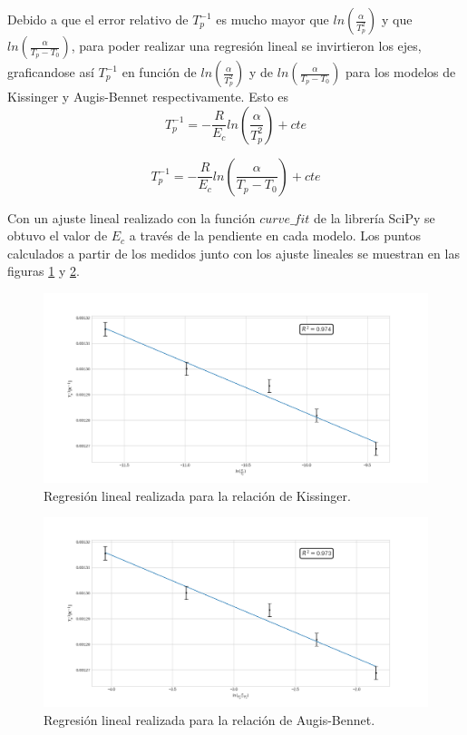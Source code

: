 \documentclass{article}
\theoremstyle{definition}
\theoremstyle{remark}
\begin{document}
Debido a que el error relativo de $T_p^{-1}$ es mucho mayor que $ln(\frac{\alpha}{T_p^2})$ y que $ln(\frac{\alpha}{T_p-T_0})$, para poder realizar una regresión lineal se invirtieron los ejes, graficandose así $T_p^{-1}$ en función de $ln(\frac{\alpha}{T_p^2})$ y de $ln(\frac{\alpha}{T_p-T_0})$ para los modelos de Kissinger y Augis-Bennet respectivamente. Esto es
\begin{equation}
	T_p^{-1}=-\frac{R}{E_c}ln(\frac{\alpha}{T_p^2})+cte
\end{equation}

\begin{equation}
	T_p^{-1}=-\frac{R}{E_c}ln(\frac{\alpha}{T_p-T_0})+cte
\end{equation}

Con un ajuste lineal realizado con la función $curve\_fit$ de la librería SciPy se obtuvo el valor de $E_c$ a través de la pendiente en cada modelo. Los puntos calculados a partir de los medidos junto con los ajuste lineales se muestran en las figuras \ref{Kiss} y \ref{AugBen}.


\begin{figure}[H]
 	\centering
	\includegraphics[scale=0.4]{img/Kissinger.png}
 	\caption{Regresión lineal realizada para la relación de Kissinger.}
	\label{Kiss}
\end{figure} 

 \begin{figure}[H]
 	\centering
	\includegraphics[scale=0.4]{img/Augis_bennet.png}
 	\caption{Regresión lineal realizada para la relación de Augis-Bennet.}
	\label{AugBen}
\end{figure} 
\end{document}
